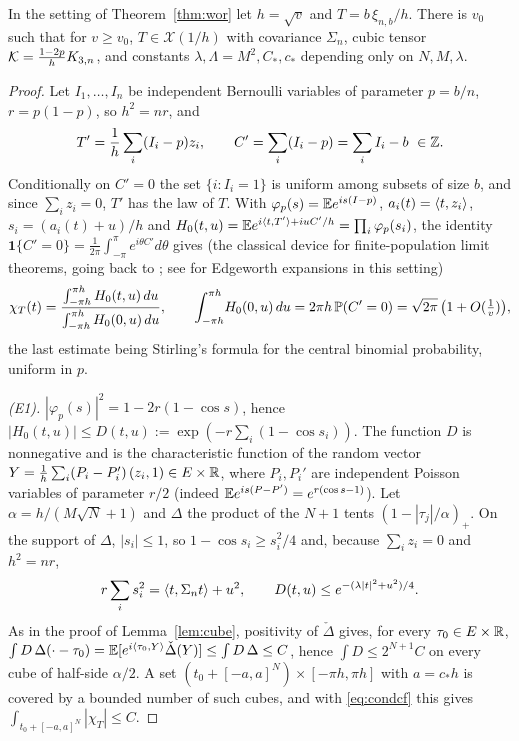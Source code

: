 \begin{proposition}\label{prop:worclass}
In the setting of Theorem~\ref{thm:wor} let $h=\sqrt v$ and $T=b\,\xi_{n,b}/h$. There is $v_0$ such that for $v\ge v_0$,
$T\in\mathcal X(1/h)$ with covariance $\Sigma_n$, cubic tensor $\mathcal{K}=\frac{1-2p}{h}K_{3,n}$, and constants
$\lambda,\Lambda=M^2,C_\ast,c_\ast$ depending only on $N,M,\lambda$.
\end{proposition}
\begin{proof}
Let $I_1,\dots,I_n$ be independent Bernoulli variables of parameter $p=b/n$, $r=p(1-p)$, so $h^2=nr$, and
\[
T'=\frac1h\sum_i(I_i-p)z_i,\qquad C'=\sum_i(I_i-p)=\sum_iI_i-b\ \in\mathbb{Z} .
\]
Conditionally on $C'=0$ the set $\{i:I_i=1\}$ is uniform among subsets of size $b$, and since $\sum_iz_i=0$, $T'$ has
the law of $T$. With $\varphi_p(s)=\mathbb{E} e^{is(I-p)}$, $a_i(t)=\langle t, z_i\rangle$, $s_i=(a_i(t)+u)/h$ and
$H_0(t,u)=\mathbb{E} e^{i\langle t, T'\rangle+iuC'/h}=\prod_i\varphi_p(s_i)$, the identity
$\mathbf 1\{C'=0\}=\frac1{2\pi}\int_{-\pi}^{\pi}e^{i\theta C'}d\theta$ gives (the classical device for finite-population limit theorems, going back to \citet{erdosrenyi}; see
\citet{bs} for Edgeworth expansions in this setting)
\begin{equation}\label{eq:condcf}
\chi_T(t)=\frac{\int_{-\pi h}^{\pi h}H_0(t,u)\,du}{\int_{-\pi h}^{\pi h}H_0(0,u)\,du},\qquad
\int_{-\pi h}^{\pi h}\!H_0(0,u)\,du=2\pi h\,\mathbb{P}(C'=0)=\sqrt{2\pi}\,\big(1+O(\tfrac1v)\big),
\end{equation}
the last estimate being Stirling's formula for the central binomial probability, uniform in $p$.

\emph{\textup{(E1)}.} $|\varphi_p(s)|^2=1-2r(1-\cos s)$, hence $|H_0(t,u)|\le D(t,u):=\exp(-r\sum_i(1-\cos s_i))$. The function
$D$ is nonnegative and is the characteristic function of the random vector
$Y=\frac1h\sum_i(P_i-P_i')\,(z_i,1)\in E\times\mathbb{R}$, where $P_i,P_i'$ are independent Poisson variables of parameter $r/2$
(indeed $\mathbb{E} e^{is(P-P')}=e^{r(\cos s-1)}$). Let $\alpha=h/(M\sqrt N+1)$ and $\Delta$ the product of the $N+1$ tents
$(1-|\tau_j|/\alpha)_+$. On the support of $\Delta$, $|s_i|\le1$, so $1-\cos s_i\ge s_i^2/4$ and, because $\sum_iz_i=0$ and
$h^2=nr$,
\[
r\sum_is_i^2=\langle t, \Sigma_nt\rangle+u^2,\qquad D(t,u)\le e^{-(\lambda|t|^2+u^2)/4}.
\]
As in the proof of Lemma~\ref{lem:cube}, positivity of $\check\Delta$ gives, for every $\tau_0\in E\times\mathbb{R}$,
$\int D\,\Delta(\cdot-\tau_0)=\mathbb{E}[e^{i\langle \tau_0, Y\rangle}\check\Delta(Y)]\le\int D\,\Delta\le C$, hence $\int D\le2^{N+1}C$ on every
cube of half-side $\alpha/2$. A set $(t_0+[-a,a]^N)\times[-\pi h,\pi h]$ with $a=c_\ast h$ is covered by a bounded number of
such cubes, and with \eqref{eq:condcf} this gives $\int_{t_0+[-a,a]^N}|\chi_T|\le C$.


\end{proof}
